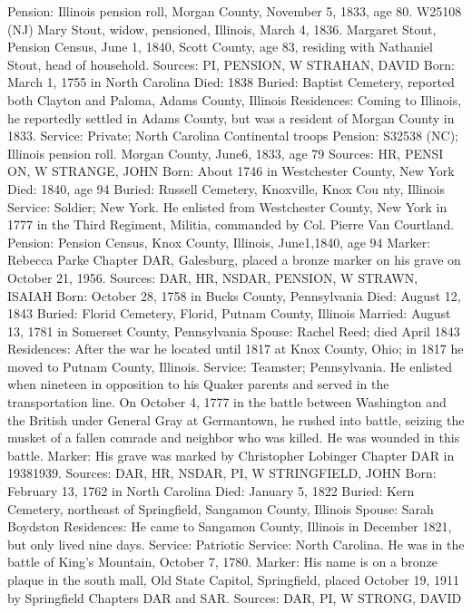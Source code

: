 Pension: Illinois pension roll, Morgan County, November 5, 1833, age 80. W25108 (NJ) Mary Stout, widow, pensioned, Illinois, March 4, 1836. Margaret Stout, Pension Census, June 1, 1840, Scott County, age 83, residing with Nathaniel Stout, head of household. 
Sources: PI, PENSION, W 
STRAHAN, DAVID 
Born: March 1, 1755 in North Carolina
Died: 1838
Buried: Baptist Cemetery, reported both Clayton and Paloma, Adams County, Illinois Residences: Coming to Illinois, he reportedly settled in Adams County, but was a resident of Morgan County in 1833.
Service: Private; North Carolina Continental troops
Pension: S32538 (NC); Illinois pension roll. Morgan County, June6, 1833, age 79 
Sources: HR, PENSI ON, W 
STRANGE, JOHN
Born: About 1746 in Westchester County, New York
Died: 1840, age 94
Buried: Russell Cemetery, Knoxville, Knox Cou nty, Illinois
Service: Soldier; New York. He enlisted from Westchester County, New York in 1777 in the Third Regiment, Militia, commanded by Col. Pierre Van Courtland.
Pension: Pension Census, Knox County, Illinois, June1,1840, age 94
Marker: Rebecca Parke Chapter DAR, Galesburg, placed a bronze marker on his grave on October 21, 1956.
Sources: DAR, HR, NSDAR, PENSION, W 
STRAWN, ISAIAH 
Born: October 28, 1758 in Bucks County, Pennsylvania 
Died: August 12, 1843 
Buried: Florid Cemetery, Florid, Putnam County, Illinois 
Married: August 13, 1781 in Somerset County, Pennsylvania 
Spouse: Rachel Reed; died April 1843 
Residences: After the war he located until 1817 at Knox County, Ohio; in 1817 he moved to Putnam County, Illinois.
Service: Teamster; Pennsylvania. He enlisted when nineteen in opposition to his Quaker parents and served in the transportation line. On October 4, 1777 in the battle between Washington and the British under General Gray at Ger­mantown, he rushed into battle, seizing the musket of a fallen comrade and neighbor who was killed. He was wounded in this battle.
Marker: His grave was marked by Christopher Lobinger Chapter DAR in 1938­1939.
Sources: DAR, HR, NSDAR, PI, W 
STRINGFIELD, JOHN 
Born: February 13, 1762 in North Carolina
Died: January 5, 1822
Buried: Kern Cemetery, northeast of Springfield, Sangamon County, Illinois
Spouse:  Sarah Boydston 
Residences: He came to Sangamon County, Illinois in December 1821, but only lived nine days.
Service: Patriotic Service: North Carolina. He was in the battle of King's Moun­tain, October 7, 1780.
Marker: His name is on a bronze plaque in the south mall, Old State Capitol, Springfield, placed October 19, 1911 by Springfield Chapters DAR and SAR.
Sources: DAR, PI, W 
STRONG, DAVID
